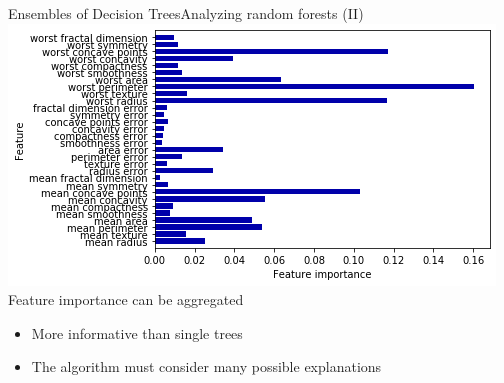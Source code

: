 \documentclass[10pt,compress]{beamer} %
\begin{document}
\begin{frame}{Ensembles of Decision Trees}{Analyzing random forests (II)}
    \centering \includegraphics[width=0.8\linewidth]{figs/forest-importance.png}\\
    \vspace{-0.2cm}
    \flushleft Feature importance can be aggregated
    \begin{itemize}
        \item More informative than single trees
        \item The algorithm must consider many possible explanations
    \end{itemize}
\end{frame}
\end{document}
